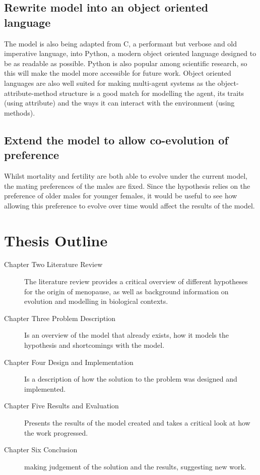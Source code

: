\documentclass[authoryearcitations]{UoYCSproject}
\begin{document}
\subsection{Rewrite model into an object oriented language}
The model is also being adapted from C, a performant but verbose and old imperative language, into Python, a modern object oriented language designed to be as readable as possible. Python is also popular among scientific research, so this will make the model more accessible for future work. Object oriented languages are also well suited for making multi-agent systems as the object-attribute-method structure is a good match for modelling the agent, its traits (using attribute) and the ways it can interact with the environment (using methods).

\subsection{Extend the model to allow co-evolution of preference}
Whilst mortality and fertility are both able to evolve under the current model, the mating preferences of the males are fixed. Since the hypothesis relies on the preference of older males for younger females, it would be useful to see how allowing this preference to evolve over time would affect the results of the model.

\section{Thesis Outline}
\begin{description}

\item[Chapter Two Literature Review] The literature review provides a critical overview of different hypotheses for the origin of menopause, as well as background information on evolution and modelling in biological contexts.
\item[Chapter Three Problem Description] Is an overview of the model that already exists, how it models the hypothesis and shortcomings with the model.
\item[Chapter Four Design and Implementation] Is a description of how the solution to the problem was designed and implemented.

\item[Chapter Five Results and Evaluation] Presents the results of the model created and takes a critical look at how the work progressed.

\item[Chapter Six Conclusion] making judgement of the solution and the results, suggesting new work.

\end{description}
\end{document}
